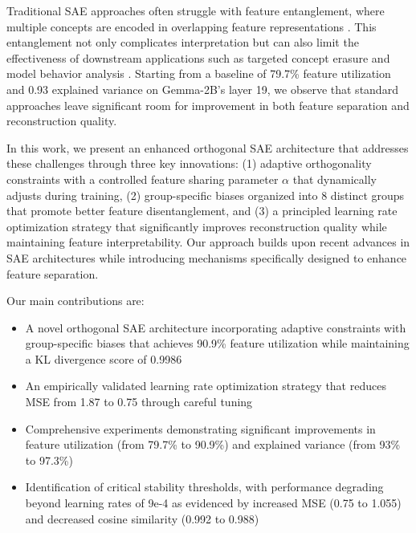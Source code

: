 \documentclass{article} %
\begin{document}
Traditional SAE approaches often struggle with feature entanglement, where multiple concepts are encoded in overlapping feature representations \cite{chaninAbsorptionStudyingFeature2024}. This entanglement not only complicates interpretation but can also limit the effectiveness of downstream applications such as targeted concept erasure \cite{karvonenEvaluatingSparseAutoencoders2024} and model behavior analysis \cite{marksSparseFeatureCircuits2024}. Starting from a baseline of 79.7\% feature utilization and 0.93 explained variance on Gemma-2B's layer 19, we observe that standard approaches leave significant room for improvement in both feature separation and reconstruction quality.

In this work, we present an enhanced orthogonal SAE architecture that addresses these challenges through three key innovations: (1) adaptive orthogonality constraints with a controlled feature sharing parameter $\alpha$ that dynamically adjusts during training, (2) group-specific biases organized into 8 distinct groups that promote better feature disentanglement, and (3) a principled learning rate optimization strategy that significantly improves reconstruction quality while maintaining feature interpretability. Our approach builds upon recent advances in SAE architectures \cite{rajamanoharanJumpingAheadImproving2024} while introducing mechanisms specifically designed to enhance feature separation.

Our main contributions are:
\begin{itemize}
    \item A novel orthogonal SAE architecture incorporating adaptive constraints with group-specific biases that achieves 90.9\% feature utilization while maintaining a KL divergence score of 0.9986
    \item An empirically validated learning rate optimization strategy that reduces MSE from 1.87 to 0.75 through careful tuning
    \item Comprehensive experiments demonstrating significant improvements in feature utilization (from 79.7\% to 90.9\%) and explained variance (from 93\% to 97.3\%)
    \item Identification of critical stability thresholds, with performance degrading beyond learning rates of 9e-4 as evidenced by increased MSE (0.75 to 1.055) and decreased cosine similarity (0.992 to 0.988)
\end{itemize}
\end{document}
